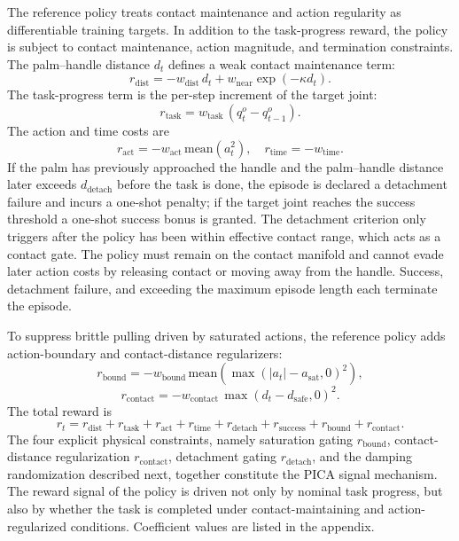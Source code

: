 The reference policy treats contact maintenance and action regularity
as differentiable training targets. In addition to the task-progress
reward, the policy is subject to contact maintenance, action
magnitude, and termination constraints. The palm--handle distance
$d_t$ defines a weak contact
maintenance term:
\begin{equation}
r_{\mathrm{dist}} = -w_{\mathrm{dist}}\,d_t
+ w_{\mathrm{near}}\exp(-\kappa d_t).
\end{equation}
The task-progress term is the per-step increment of the target joint:
\begin{equation}
r_{\mathrm{task}} = w_{\mathrm{task}}\,(q_t^o - q_{t-1}^o).
\end{equation}
The action and time costs are
\begin{equation}
r_{\mathrm{act}} = -w_{\mathrm{act}}\,
\mathrm{mean}(a_t^2),\quad
r_{\mathrm{time}} = -w_{\mathrm{time}}.
\end{equation}
If the palm has previously approached the handle and the palm--handle
distance later exceeds $d_{\mathrm{detach}}$ before the task is
done, the episode is declared a detachment failure and incurs a
one-shot penalty; if the target joint reaches the success threshold
a one-shot success bonus is granted. The detachment criterion only
triggers after the policy has been within effective contact range,
which acts as a contact gate. The policy must remain on the contact
manifold and cannot evade later action costs by releasing contact or
moving away from the handle. Success, detachment failure, and
exceeding the maximum episode length each terminate the episode.

To suppress brittle pulling driven by saturated actions, the
reference policy adds action-boundary and contact-distance
regularizers:
\begin{equation}
r_{\mathrm{bound}} = -w_{\mathrm{bound}}\,
\mathrm{mean}\!\left(
\max(|a_t|-a_{\mathrm{sat}},0)^2\right),
\end{equation}
\begin{equation}
r_{\mathrm{contact}} = -w_{\mathrm{contact}}\,
\max(d_t-d_{\mathrm{safe}},0)^2.
\end{equation}
The total reward is
\begin{equation}
r_t = r_{\mathrm{dist}} + r_{\mathrm{task}} + r_{\mathrm{act}}
+ r_{\mathrm{time}} + r_{\mathrm{detach}}
+ r_{\mathrm{success}}
+ r_{\mathrm{bound}} + r_{\mathrm{contact}}.
\label{eq:totalreward}
\end{equation}
The four explicit physical constraints, namely saturation gating
$r_{\mathrm{bound}}$, contact-distance regularization
$r_{\mathrm{contact}}$, detachment gating $r_{\mathrm{detach}}$, and
the damping randomization described next, together constitute the
PICA signal mechanism. The reward signal of the policy is driven not
only by nominal task progress, but also by whether the task is
completed under contact-maintaining and action-regularized
conditions. Coefficient values are listed in the appendix.

